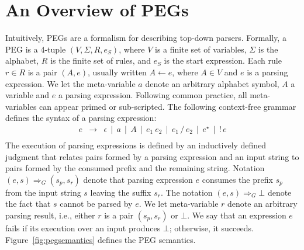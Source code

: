 \section{An Overview of PEGs}\label{sec:pegs}

Intuitively, PEGs are a formalism for describing top-down parsers.
Formally, a PEG is a 4-tuple \((V,\Sigma,R,e_S)\), where \(V\) is a
finite set of variables, \(\Sigma\) is the alphabet, \(R\) is the finite
set of rules, and \(e_S\) is the start expression. Each rule \(r \in R\) is a
pair \((A,e)\), usually written \(A \leftarrow e\), where \(A \in V\) and \(e\)
is a parsing expression. We let the meta-variable \(a\) denote an
arbitrary alphabet symbol, \(A\) a variable and \(e\) a parsing expression.
Following common practice, all meta-variables can appear primed or
sub-scripted. The following context-free grammar defines
the syntax of a parsing expression:
\[
   \begin{array}{lcl}
      e & \to & \epsilon \, \mid \, a \, \mid \, A\, \mid \,e_1\:e_2\,
                  \mid\,e_1\,/\,e_2\, \mid \,e^\star\, \mid \,!\,e \\
   \end{array}
\]
The execution of parsing expressions is defined by an inductively defined
judgment that relates pairs formed by a parsing expression and an input string
to pairs formed by the consumed prefix and the remaining string.
Notation \((e,s) \Rightarrow_G (s_p,s_r)\) denote that parsing expression \(e\)
consumes the prefix \(s_p\) from the input string \(s\) leaving the suffix \(s_r\).
The notation \((e,s) \Rightarrow_G \bot\) denote the fact that \(s\) cannot be
parsed by \(e\). We let meta-variable \(r\) denote an arbitrary parsing result, i.e.,
either \(r\) is a pair \((s_p,s_r)\) or \(\bot\). We say that an expression \(e\)
fails if its execution over an input produces \(\bot\); otherwise, it succeeds.
Figure~\ref{fig:pegsemantics} defines the PEG semantics.
